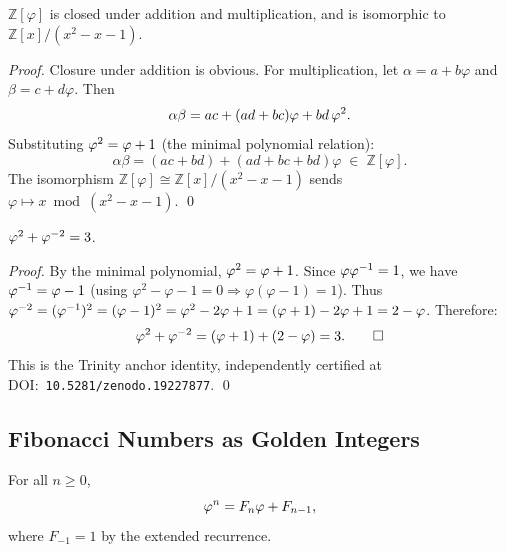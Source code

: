 \begin{proposition}\label{prop:ring}
\(\mathbb{Z}[\varphi]\) is closed under addition and multiplication, and is
isomorphic to \(\mathbb{Z}[x]/(x^2 - x - 1)\).
\end{proposition}

\begin{proof}
Closure under addition is obvious.  For multiplication, let
\(\alpha = a + b\varphi\) and \(\beta = c + d\varphi\).  Then
\[
  \alpha\beta = ac + (ad+bc)\varphi + bd\,\varphi^{2}.
\]
Substituting \(\varphi^{2} = \varphi + 1\) (the minimal polynomial relation):
\[
  \alpha\beta = (ac+bd) + (ad+bc+bd)\varphi \;\in\; \mathbb{Z}[\varphi].
\]
The isomorphism \(\mathbb{Z}[\varphi] \cong \mathbb{Z}[x]/(x^2-x-1)\) sends
\(\varphi \mapsto x \bmod (x^2-x-1)\).
\qed
\end{proof}

\begin{corollary}\label{cor:trinity-anchor}
\(\varphi^{2} + \varphi^{-2} = 3\).
\end{corollary}

\begin{proof}
By the minimal polynomial, \(\varphi^{2} = \varphi + 1\).
Since \(\varphi\varphi^{-1} = 1\), we have \(\varphi^{-1} = \varphi - 1\)
(using \(\varphi^2 - \varphi - 1 = 0 \Rightarrow \varphi(\varphi-1) = 1\)).
Thus \(\varphi^{-2} = (\varphi^{-1})^2 = (\varphi-1)^2 = \varphi^{2} - 2\varphi + 1
= (\varphi+1) - 2\varphi + 1 = 2 - \varphi\).
Therefore:
\[
  \varphi^{2} + \varphi^{-2} = (\varphi+1) + (2-\varphi) = 3. \qquad \square
\]
This is the Trinity anchor identity, independently certified at
DOI:~\texttt{10.5281/zenodo.19227877}.
\qed
\end{proof}

\subsection{Fibonacci Numbers as Golden Integers}\label{subsec:ch7-fib-golden}

\begin{proposition}\label{prop:binet-coords}
For all \(n \geq 0\),
\[
  \varphi^{n} = F_n \varphi + F_{n-1},
\]
where \(F_{-1} = 1\) by the extended recurrence.
\end{proposition}

